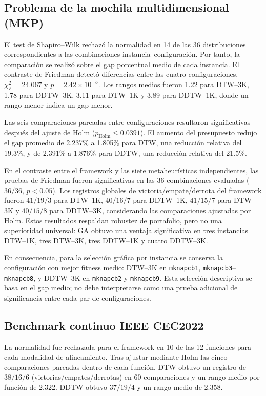 \subsection{Problema de la mochila multidimensional (MKP)}
\label{sec:estadistico-mkp-es}

El test de Shapiro--Wilk rechaz\'o la normalidad en 14 de las 36 distribuciones
correspondientes a las combinaciones instancia--configuraci\'on. Por tanto, la
comparaci\'on se realiz\'o sobre el gap porcentual medio de cada instancia. El
contraste de Friedman detect\'o diferencias entre las cuatro configuraciones,
$\chi_F^2=24.067$ y $p=2.42\times10^{-5}$. Los rangos medios fueron 1.22 para
DTW--3K, 1.78 para DDTW--3K, 3.11 para DTW--1K y 3.89 para DDTW--1K, donde un
rango menor indica un gap menor.

Las seis comparaciones pareadas entre configuraciones resultaron significativas
despu\'es del ajuste de Holm ($p_{\mathrm{Holm}}\leq0.0391$). El aumento del
presupuesto redujo el gap promedio de 2.237\% a 1.805\% para DTW, una reducci\'on
relativa del 19.3\%, y de 2.391\% a 1.876\% para DDTW, una reducci\'on relativa
del 21.5\%.

En el contraste entre el framework y las siete metaheur\'isticas independientes,
las pruebas de Friedman fueron significativas en las 36 combinaciones evaluadas
($36/36$, $p<0.05$). Los registros globales de victoria/empate/derrota del
framework fueron $41/19/3$ para DTW--1K, $40/16/7$ para DDTW--1K, $41/15/7$
para DTW--3K y $40/15/8$ para DDTW--3K, considerando las comparaciones ajustadas
por Holm. Estos resultados respaldan robustez de portafolio, pero no una
superioridad universal: GA obtuvo una ventaja significativa en tres instancias
DTW--1K, tres DTW--3K, tres DDTW--1K y cuatro DDTW--3K.

En consecuencia, para la selecci\'on gr\'afica por instancia se conserva la
configuraci\'on con mejor fitness medio: DTW--3K en
\texttt{mknapcb1}, \texttt{mknapcb3}--\texttt{mknapcb8}, y DDTW--3K en
\texttt{mknapcb2} y \texttt{mknapcb9}. Esta selecci\'on descriptiva se basa en
el gap medio; no debe interpretarse como una prueba adicional de significancia
entre cada par de configuraciones.

\subsection{Benchmark continuo IEEE CEC2022}
\label{sec:estadistico-cec-es}

La normalidad fue rechazada para el framework en 10 de las 12 funciones para
cada modalidad de alineamiento. Tras ajustar mediante Holm las cinco
comparaciones pareadas dentro de cada funci\'on, DTW obtuvo un registro de
$38/16/6$ (victorias/empates/derrotas) en 60 comparaciones y un rango medio
por funci\'on de 2.322. DDTW obtuvo $37/19/4$ y un rango medio de 2.358.

